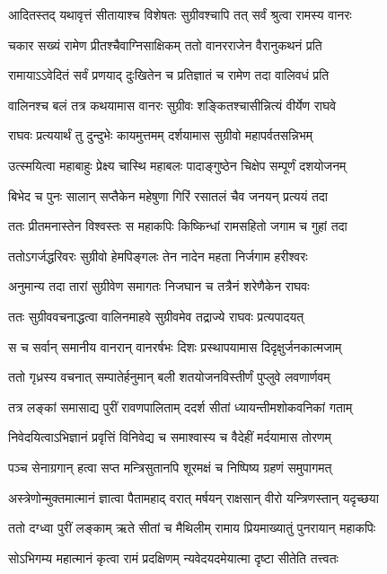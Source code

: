 \twolineshloka
{आदितस्तद् यथावृत्तं सीतायाश्च विशेषतः}
{सुग्रीवश्चापि तत् सर्वं श्रुत्वा रामस्य वानरः}%

\twolineshloka
{चकार सख्यं रामेण प्रीतश्चैवाग्निसाक्षिकम्}
{ततो वानरराजेन वैरानुकथनं प्रति}%

\twolineshloka
{रामायाऽऽवेदितं सर्वं प्रणयाद् दुःखितेन च}
{प्रतिज्ञातं च रामेण तदा वालिवधं प्रति}%

\twolineshloka
{वालिनश्च बलं तत्र कथयामास वानरः}
{सुग्रीवः शङ्कितश्चासीन्नित्यं वीर्येण राघवे}%

\twolineshloka
{राघवः प्रत्ययार्थं तु दुन्दुभेः कायमुत्तमम्}
{दर्शयामास सुग्रीवो महापर्वतसन्निभम्}%

\twolineshloka
{उत्स्मयित्वा महाबाहुः प्रेक्ष्य चास्थि महाबलः}
{पादाङ्गुष्ठेन चिक्षेप सम्पूर्णं दशयोजनम्}%

\twolineshloka
{बिभेद च पुनः सालान् सप्तैकेन महेषुणा}
{गिरिं रसातलं चैव जनयन् प्रत्ययं तदा}%

\twolineshloka
{ततः प्रीतमनास्तेन विश्वस्तः स महाकपिः}
{किष्किन्धां रामसहितो जगाम च गुहां तदा}%

\twolineshloka
{ततोऽगर्जद्धरिवरः सुग्रीवो हेमपिङ्गलः}
{तेन नादेन महता निर्जगाम हरीश्वरः}%

\twolineshloka
{अनुमान्य तदा तारां सुग्रीवेण समागतः}
{निजघान च तत्रैनं शरेणैकेन राघवः}%

\twolineshloka
{ततः सुग्रीववचनाद्धत्वा वालिनमाहवे}
{सुग्रीवमेव तद्राज्ये राघवः प्रत्यपादयत्}%

\twolineshloka
{स च सर्वान् समानीय वानरान् वानरर्षभः}
{दिशः प्रस्थापयामास दिदृक्षुर्जनकात्मजाम्}%

\twolineshloka
{ततो गृध्रस्य वचनात् सम्पातेर्हनुमान् बली}
{शतयोजनविस्तीर्णं पुप्लुवे लवणार्णवम्}%

\twolineshloka
{तत्र लङ्कां समासाद्य पुरीं रावणपालिताम्}
{ददर्श सीतां ध्यायन्तीमशोकवनिकां गताम्}%

\twolineshloka
{निवेदयित्वाऽभिज्ञानं प्रवृत्तिं विनिवेद्य च}
{समाश्वास्य च वैदेहीं मर्दयामास तोरणम्}%

\twolineshloka
{पञ्च सेनाग्रगान् हत्वा सप्त मन्त्रिसुतानपि}
{शूरमक्षं च निष्पिष्य ग्रहणं समुपागमत्}%

\twolineshloka
{अस्त्रेणोन्मुक्तमात्मानं ज्ञात्वा पैतामहाद् वरात्}
{मर्षयन् राक्षसान् वीरो यन्त्रिणस्तान् यदृच्छया}%

\twolineshloka
{ततो दग्ध्वा पुरीं लङ्काम् ऋते सीतां च मैथिलीम्}
{रामाय प्रियमाख्यातुं पुनरायान् महाकपिः}%

\twolineshloka
{सोऽभिगम्य महात्मानं कृत्वा रामं प्रदक्षिणम्}
{न्यवेदयदमेयात्मा दृष्टा सीतेति तत्त्वतः}%

